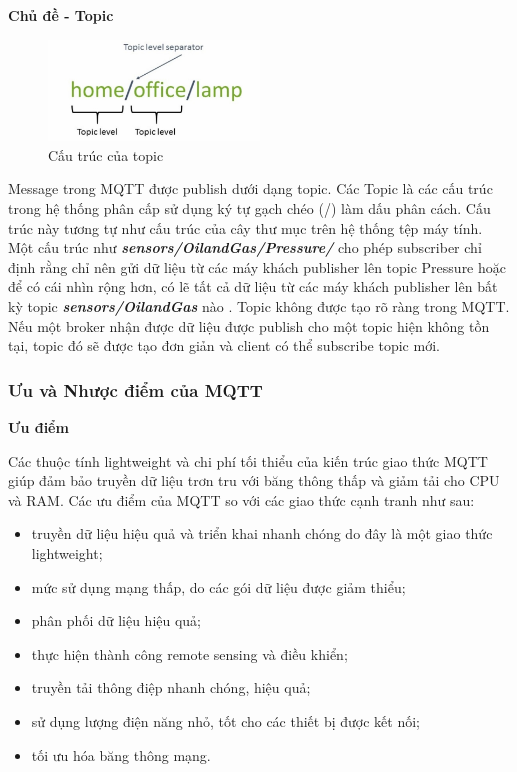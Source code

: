 \textbf{Chủ đề - Topic}

\begin{figure}[!h]
    \centering
    \includegraphics[width=0.5\textwidth]{Images/Basis_knowledge/topic.jpg}
    \caption{Cấu trúc của topic \cite{mqttw}}
    \label{fig:comp_mqtt}
\end{figure}
Message trong MQTT được publish dưới dạng topic. Các Topic là các cấu trúc trong hệ thống phân cấp sử dụng ký tự gạch chéo (/) làm dấu phân cách. Cấu trúc này tương tự như cấu trúc của cây thư mục trên hệ thống tệp máy tính. Một cấu trúc như \textbf{\textit{sensors/OilandGas/Pressure/}} cho phép subscriber chỉ định rằng chỉ nên gửi dữ liệu từ các máy khách publisher lên topic Pressure hoặc để có cái nhìn rộng hơn, có lẽ tất cả dữ liệu từ các máy khách publisher lên bất kỳ topic \textbf{\textit{sensors/OilandGas }} nào . Topic không được tạo rõ ràng trong MQTT. Nếu một broker nhận được dữ liệu được publish cho một topic hiện không tồn tại, topic đó sẽ được tạo đơn giản và client có thể subscribe topic mới.

\subsubsection{Ưu và Nhược điểm của MQTT}

\textbf{Ưu điểm}

Các thuộc tính lightweight và chi phí tối thiểu của kiến trúc giao thức MQTT giúp đảm bảo truyền dữ liệu trơn tru với băng thông thấp và giảm tải cho CPU và RAM. Các ưu điểm của MQTT so với các giao thức cạnh tranh như sau:
\begin{itemize}
    \item truyền dữ liệu hiệu quả và triển khai nhanh chóng do đây là một giao thức lightweight;
    \item mức sử dụng mạng thấp, do các gói dữ liệu được giảm thiểu;
    \item phân phối dữ liệu hiệu quả;
    \item thực hiện thành công remote sensing và điều khiển;
    \item truyền tải thông điệp nhanh chóng, hiệu quả;
    \item sử dụng lượng điện năng nhỏ, tốt cho các thiết bị được kết nối;
    \item tối ưu hóa băng thông mạng.
\end{itemize}

